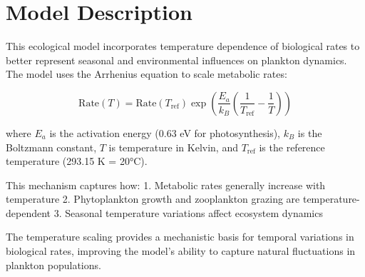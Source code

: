 \section{Model Description}

This ecological model incorporates temperature dependence of biological rates to better represent seasonal and environmental influences on plankton dynamics. The model uses the Arrhenius equation to scale metabolic rates:

\[ \text{Rate}(T) = \text{Rate}(T_{\text{ref}}) \exp\left(\frac{E_a}{k_B}\left(\frac{1}{T_{\text{ref}}} - \frac{1}{T}\right)\right) \]

where $E_a$ is the activation energy (0.63 eV for photosynthesis), $k_B$ is the Boltzmann constant, $T$ is temperature in Kelvin, and $T_{\text{ref}}$ is the reference temperature (293.15 K = 20°C).

This mechanism captures how:
1. Metabolic rates generally increase with temperature
2. Phytoplankton growth and zooplankton grazing are temperature-dependent
3. Seasonal temperature variations affect ecosystem dynamics

The temperature scaling provides a mechanistic basis for temporal variations in biological rates, improving the model's ability to capture natural fluctuations in plankton populations.
